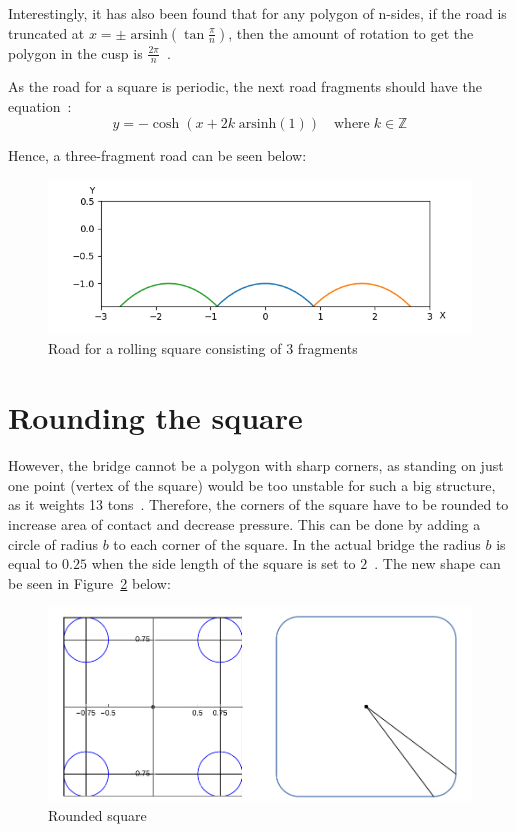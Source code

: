 \documentclass[12pt]{article}
\begin{document}
        Interestingly, it has also been found that for any polygon of n-sides, if the road is truncated at $x = \pm \; \text{arsinh}(\tan\frac{\pi}{n})$, then the amount of rotation to get the polygon in the cusp is $\frac{2\pi}{n}$~\cite{Hall_Wagon_1992}.
        
        As the road for a square is periodic, the next road fragments should have the equation~\cite{Hall_Wagon_1992}:
        \begin{equation}
            y = - \cosh (x + 2k \;\text{arsinh}(1) ) \quad \text{where}\; k \in \mathbb{Z}
        \end{equation}
        
        Hence, a three-fragment road can be seen below:
        \begin{figure}[H]
            \centering
            \includegraphics[width=\linewidth]{images/road_3.png}
            \caption{Road for a rolling square consisting of 3 fragments}\label{fig:road3}
        \end{figure}

    \section{Rounding the square}

        However, the bridge cannot be a polygon with sharp corners, as standing on just one point (vertex of the square) would be too unstable for such a big structure, as it weights 13 tons~\cite{bridge_newatlas}. Therefore, the corners of the square have to be rounded to increase area of contact and decrease pressure. This can be done by adding a circle of radius $b$ to each corner of the square. In the actual bridge the radius $b$ is equal to $0.25$ when the side length of the square is set to $2$~\cite{bridge_wolfram}. The new shape can be seen in Figure~\ref{fig:rounded_square} below:

        \begin{figure}[H]
            \centering
            \includegraphics[width=0.9\linewidth]{images/rounded_square.png}
            \caption{Rounded square~\cite{bridge_wolfram}}\label{fig:rounded_square}
        \end{figure}
\end{document}
